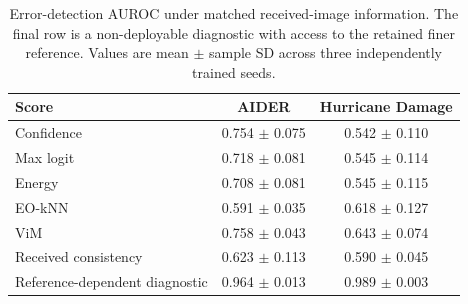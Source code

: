 \begin{table}[t]
\centering
\caption{Error-detection AUROC under matched received-image information. The final row is a non-deployable diagnostic with access to the retained finer reference. Values are mean $\pm$ sample SD across three independently trained seeds.}
\label{tab:matched-auroc}
\begin{tabular}{lcc}
\toprule
Score & AIDER & Hurricane Damage \\
\midrule
Confidence & 0.754 $\pm$ 0.075 & 0.542 $\pm$ 0.110 \\
Max logit & 0.718 $\pm$ 0.081 & 0.545 $\pm$ 0.114 \\
Energy & 0.708 $\pm$ 0.081 & 0.545 $\pm$ 0.115 \\
EO-kNN & 0.591 $\pm$ 0.035 & 0.618 $\pm$ 0.127 \\
ViM & 0.758 $\pm$ 0.043 & 0.643 $\pm$ 0.074 \\
Received consistency & 0.623 $\pm$ 0.113 & 0.590 $\pm$ 0.045 \\
Reference-dependent diagnostic & 0.964 $\pm$ 0.013 & 0.989 $\pm$ 0.003 \\
\bottomrule
\end{tabular}
\end{table}
